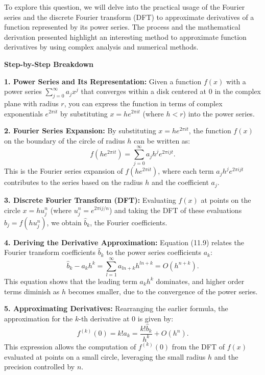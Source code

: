 \documentclass[8pt]{article}
\begin{document}
To explore this question, we will delve into the practical usage of the Fourier series and the discrete Fourier transform (DFT) to approximate derivatives of a function represented by its power series. The process and the mathematical derivation presented highlight an interesting method to approximate function derivatives by using complex analysis and numerical methods.

\textbf{Step-by-Step Breakdown}

\textbf{1. Power Series and Its Representation:}
   Given a function \( f(x) \) with a power series \( \sum_{j=0}^{\infty} a_j x^j \) that converges within a disk centered at 0 in the complex plane with radius \( r \), you can express the function in terms of complex exponentials \( e^{2\pi it} \) by substituting \( x = he^{2\pi it} \) (where \( h < r \)) into the power series.

\textbf{2. Fourier Series Expansion:}
   By substituting \( x = he^{2\pi it} \), the function \( f(x) \) on the boundary of the circle of radius \( h \) can be written as:
   \[
   f(he^{2\pi it}) = \sum_{j=0}^{\infty} a_j h^j e^{2\pi i jt}.
   \]
   This is the Fourier series expansion of \( f(he^{2\pi it}) \), where each term \( a_j h^j e^{2\pi i jt} \) contributes to the series based on the radius \( h \) and the coefficient \( a_j \).

\textbf{3. Discrete Fourier Transform (DFT):}
   Evaluating \( f(x) \) at points on the circle \( x = hu_j^n \) (where \( u_j^n = e^{2\pi i j/n} \)) and taking the DFT of these evaluations \( b_j = f(hu_j^n) \), we obtain \( \hat{b}_k \), the Fourier coefficients.

\textbf{4. Deriving the Derivative Approximation:}
   Equation (11.9) relates the Fourier transform coefficients \( \hat{b}_k \) to the power series coefficients \( a_k \):
   \[
   \hat{b}_k - a_k h^k = \sum_{l=1}^{\infty} a_{ln+k} h^{ln+k} = O(h^{n+k}).
   \]
   This equation shows that the leading term \( a_k h^k \) dominates, and higher order terms diminish as \( h \) becomes smaller, due to the convergence of the power series.

\textbf{5. Approximating Derivatives:}
   Rearranging the earlier formula, the approximation for the \( k \)-th derivative at 0 is given by:
   \[
   f^{(k)}(0) = k! a_k = \frac{k! \hat{b}_k}{h^k} + O(h^n).
   \]
   This expression allows the computation of \( f^{(k)}(0) \) from the DFT of \( f(x) \) evaluated at points on a small circle, leveraging the small radius \( h \) and the precision controlled by \( n \).
\end{document}

